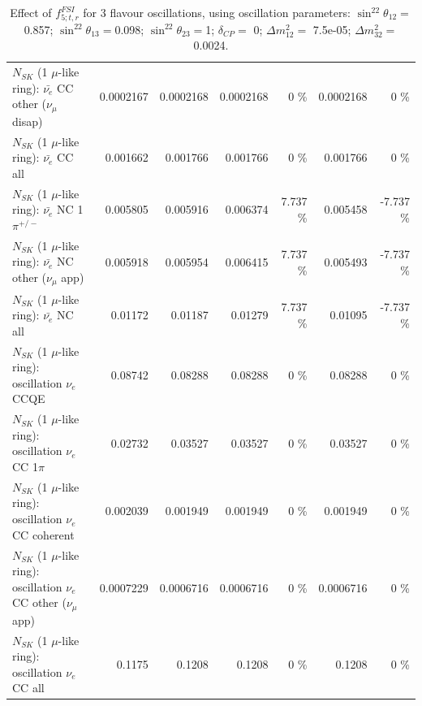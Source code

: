 \begin{table}
\begin{tabular}{| l | r | r | r  r | r  r |}
          $N_{SK}$ (1 $\mu$-like ring): $\bar{\nu_e}$ CC other ($\nu_\mu$ disap) &       0.0002167 &       0.0002168 &       0.0002168 &        0 \%  &       0.0002168 &        0 \%  \\ 
                            $N_{SK}$ (1 $\mu$-like ring): $\bar{\nu_{e}}$ CC all &        0.001662 &        0.001766 &        0.001766 &        0 \%  &        0.001766 &        0 \%  \\ 
\hline
                     $N_{SK}$ (1 $\mu$-like ring): $\bar{\nu_e}$ NC 1$\pi^{+/-}$ &        0.005805 &        0.005916 &        0.006374 &    7.737 \%  &        0.005458 &   -7.737 \%  \\ 
            $N_{SK}$ (1 $\mu$-like ring): $\bar{\nu_e}$ NC other ($\nu_\mu$ app) &        0.005918 &        0.005954 &        0.006415 &    7.737 \%  &        0.005493 &   -7.737 \%  \\ 
                            $N_{SK}$ (1 $\mu$-like ring): $\bar{\nu_{e}}$ NC all &         0.01172 &         0.01187 &         0.01279 &    7.737 \%  &         0.01095 &   -7.737 \%  \\ 
\hline
\hline
\hline
                          $N_{SK}$ (1 $\mu$-like ring): oscillation $\nu_e$ CCQE &         0.08742 &         0.08288 &         0.08288 &        0 \%  &         0.08288 &        0 \%  \\ 
                     $N_{SK}$ (1 $\mu$-like ring): oscillation $\nu_e$ CC 1$\pi$ &         0.02732 &         0.03527 &         0.03527 &        0 \%  &         0.03527 &        0 \%  \\ 
                   $N_{SK}$ (1 $\mu$-like ring): oscillation $\nu_e$ CC coherent &        0.002039 &        0.001949 &        0.001949 &        0 \%  &        0.001949 &        0 \%  \\ 
      $N_{SK}$ (1 $\mu$-like ring): oscillation $\nu_e$ CC other ($\nu_\mu$ app) &       0.0007229 &       0.0006716 &       0.0006716 &        0 \%  &       0.0006716 &        0 \%  \\ 
                       $N_{SK}$ (1 $\mu$-like ring): oscillation $\nu_e$  CC all &          0.1175 &          0.1208 &          0.1208 &        0 \%  &          0.1208 &        0 \%  \\ 
\hline
\hline
\end{tabular}
\caption{ Effect of $f_{5; t, r}^{FSI}$ for 3 flavour oscillations, using oscillation parameters:  $\sin^22\theta_{12} = $0.857; $\sin^22\theta_{13} = $0.098; $\sin^22\theta_{23} = $1; $\delta_{CP} = $        0; $\Delta m^2_{12} = $    7.5e-05; $\Delta m^2_{32} = $    0.0024. }
\label{tab:num_fsi_005_1RmuT_3f_osc_t13:0.098_spectralreco_spectraltrue}
\end{table}
\clearpage

